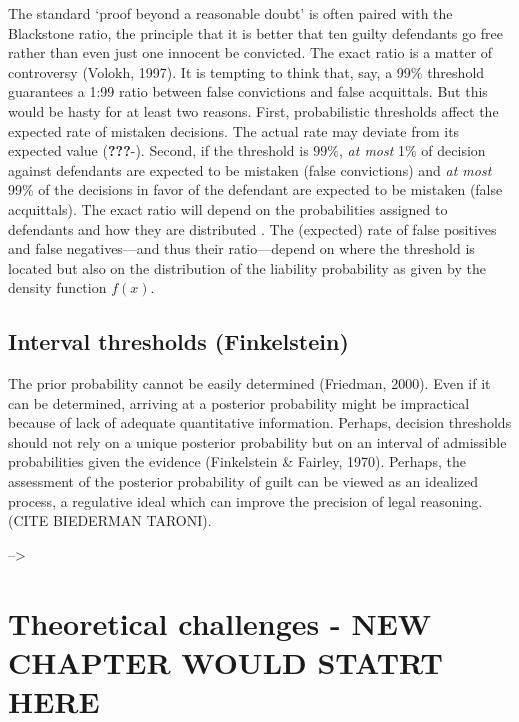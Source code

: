 \documentclass[10pt,dvipsnames,enabledeprecatedfontcommands]{scrartcl}
\begin{document}
The standard `proof beyond a reasonable doubt' is often paired with the
Blackstone ratio, the principle that it is better that ten guilty
defendants go free rather than even just one innocent be convicted. The
exact ratio is a matter of controversy (Volokh, 1997). It is tempting to
think that, say, a 99\% threshold guarantees a 1:99 ratio between false
convictions and false acquittals. But this would be hasty for at least
two reasons. First, probabilistic thresholds affect the expected rate of
mistaken decisions. The actual rate may deviate from its expected value
({\textbf{???}}-). Second, if the threshold is \(99\%\),
\textit{at most} 1\% of decision against defendants are expected to be
mistaken (false convictions) and \textit{at most} 99\% of the decisions
in favor of the defendant are expected to be mistaken (false
acquittals). The exact ratio will depend on the probabilities assigned
to defendants and how they are distributed \citep{allen2014}. The
(expected) rate of false positives and false negatives---and thus their
ratio---depend on where the threshold is located but also on the
distribution of the liability probability as given by the density
function \(f(x)\).

\hypertarget{interval-thresholds-finkelstein}{%
\subsection{Interval thresholds
(Finkelstein)}\label{interval-thresholds-finkelstein}}

The prior probability cannot be easily determined (Friedman, 2000). Even
if it can be determined, arriving at a posterior probability might be
impractical because of lack of adequate quantitative information.
Perhaps, decision thresholds should not rely on a unique posterior
probability but on an interval of admissible probabilities given the
evidence (Finkelstein \& Fairley, 1970). Perhaps, the assessment of the
posterior probability of guilt can be viewed as an idealized process, a
regulative ideal which can improve the precision of legal reasoning.
(CITE BIEDERMAN TARONI).

--\textgreater{}

\hypertarget{theoretical-challenges---new-chapter-would-statrt-here}{%
\section{Theoretical challenges - NEW CHAPTER WOULD STATRT
HERE}\label{theoretical-challenges---new-chapter-would-statrt-here}}
\end{document}

